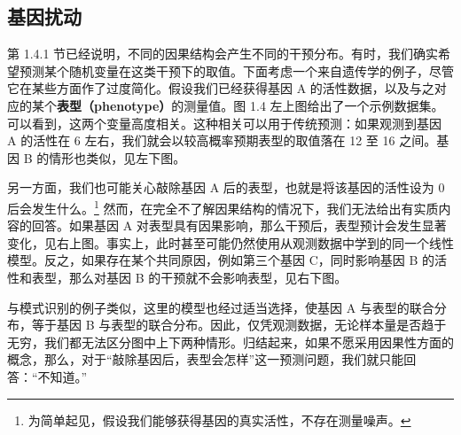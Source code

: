 

\FloatBarrier
\subsection{基因扰动}
\label{sec:gene-perturbation}

第 1.4.1 节已经说明，不同的因果结构会产生不同的干预分布。有时，我们确实希望预测某个随机变量在这类干预下的取值。下面考虑一个来自遗传学的例子，尽管它在某些方面作了过度简化。假设我们已经获得基因 A 的活性数据，以及与之对应的某个\textbf{表型（phenotype）}的测量值。图 1.4 左上图给出了一个示例数据集。可以看到，这两个变量高度相关。这种相关可以用于传统预测：如果观测到基因 A 的活性在 6 左右，我们就会以较高概率预期表型的取值落在 12 至 16 之间。基因 B 的情形也类似，见左下图。

另一方面，我们也可能关心敲除基因 A 后的表型，也就是将该基因的活性设为 0 后会发生什么。\footnote{为简单起见，假设我们能够获得基因的真实活性，不存在测量噪声。}
然而，在完全不了解因果结构的情况下，我们无法给出有实质内容的回答。如果基因 A 对表型具有因果影响，那么干预后，表型预计会发生显著变化，见右上图。事实上，此时甚至可能仍然使用从观测数据中学到的同一个线性模型。反之，如果存在某个共同原因，例如第三个基因 C，同时影响基因 B 的活性和表型，那么对基因 B 的干预就不会影响表型，见右下图。

与模式识别的例子类似，这里的模型也经过适当选择，使基因 A 与表型的联合分布，等于基因 B 与表型的联合分布。因此，仅凭观测数据，无论样本量是否趋于无穷，我们都无法区分图中上下两种情形。归结起来，如果不愿采用因果性方面的概念，那么，对于“敲除基因后，表型会怎样”这一预测问题，我们就只能回答：“不知道。”


\FloatBarrier
